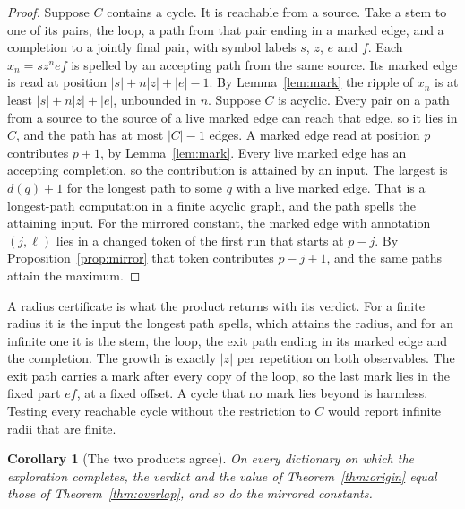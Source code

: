 \documentclass[11pt,a4paper]{article}
\theoremstyle{definition}
\theoremstyle{plain}
\newtheorem{corollary}{Corollary}
\begin{document}
\begin{proof}
Suppose \(C\) contains a cycle. It is reachable from a source. Take a stem to one of its pairs, the loop, a path from
that pair ending in a marked edge, and a completion to a jointly final pair, with symbol labels \(s\), \(z\), \(e\) and
\(f\). Each \(x_n = s z^n e f\) is spelled by an accepting path from the same source. Its marked edge is read at
position \(|s| + n|z| + |e| - 1\). By Lemma~\ref{lem:mark} the ripple of \(x_n\) is at least \(|s| + n|z| + |e|\),
unbounded in \(n\). Suppose \(C\) is acyclic. Every pair on a path from a source to the source of a live marked edge can
reach that edge, so it lies in \(C\), and the path has at most \(|C| - 1\) edges. A marked edge read at position \(p\)
contributes \(p + 1\), by Lemma~\ref{lem:mark}. Every live marked edge has an accepting completion, so the contribution
is attained by an input. The largest is \(d(q) + 1\) for the longest path to some \(q\) with a live marked edge. That is
a longest-path computation in a finite acyclic graph, and the path spells the attaining input. For the mirrored
constant, the marked edge with annotation \((j, \ell)\) lies in a changed token of the first run that starts at
\(p - j\). By Proposition~\ref{prop:mirror} that token contributes \(p - j + 1\), and the same paths attain the maximum.
\end{proof}

A radius certificate is what the product returns with its verdict. For a finite radius it is the input the longest path
spells, which attains the radius, and for an infinite one it is the stem, the loop, the exit path ending in its marked
edge and the completion. The growth is exactly \(|z|\) per repetition on both observables. The exit path carries a mark
after every copy of the loop, so the last mark lies in the fixed part \(ef\), at a fixed offset. A cycle that no mark
lies beyond is harmless. Testing every reachable cycle without the restriction to \(C\) would report infinite radii that
are finite.

\begin{corollary}[The two products agree]\label{cor:agree}
On every dictionary on which the exploration completes, the verdict and the value of Theorem~\ref{thm:origin} equal
those of Theorem~\ref{thm:overlap}, and so do the mirrored constants.
\end{corollary}
\end{document}
